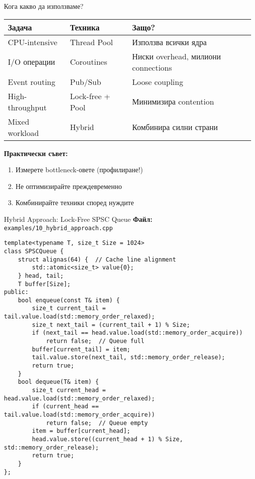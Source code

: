 \documentclass[aspectratio=169]{beamer}
\begin{document}
\begin{frame}{Кога какво да използваме?}
\begin{table}
\centering
\small
\begin{tabular}{|l|l|l|}
\hline
\textbf{Задача} & \textbf{Техника} & \textbf{Защо?} \\
\hline
CPU-intensive & Thread Pool & Използва всички ядра \\
I/O операции & Coroutines & Ниски overhead, милиони connections \\
Event routing & Pub/Sub & Loose coupling \\
High-throughput & Lock-free + Pool & Минимизира contention \\
Mixed workload & Hybrid & Комбинира силни страни \\
\hline
\end{tabular}
\end{table}

\vspace{0.5cm}

\textbf{Практически съвет:}
\begin{enumerate}
    \item Измерете bottleneck-овете (профилиране!)
    \item Не оптимизирайте преждевременно
    \item Комбинирайте техники според нуждите
\end{enumerate}
\end{frame}

\begin{frame}[fragile]{Hybrid Approach: Lock-Free SPSC Queue}
\textbf{Файл:} \texttt{examples/10\_hybrid\_approach.cpp}
\begin{lstlisting}[basicstyle=\ttfamily\tiny]
template<typename T, size_t Size = 1024>
class SPSCQueue {
    struct alignas(64) {  // Cache line alignment
        std::atomic<size_t> value{0};
    } head, tail;
    T buffer[Size];
public:
    bool enqueue(const T& item) {
        size_t current_tail = tail.value.load(std::memory_order_relaxed);
        size_t next_tail = (current_tail + 1) % Size;
        if (next_tail == head.value.load(std::memory_order_acquire))
            return false;  // Queue full
        buffer[current_tail] = item;
        tail.value.store(next_tail, std::memory_order_release);
        return true;
    }
    bool dequeue(T& item) {
        size_t current_head = head.value.load(std::memory_order_relaxed);
        if (current_head == tail.value.load(std::memory_order_acquire))
            return false;  // Queue empty
        item = buffer[current_head];
        head.value.store((current_head + 1) % Size, std::memory_order_release);
        return true;
    }
};
\end{lstlisting}
\end{frame}
\end{document}
